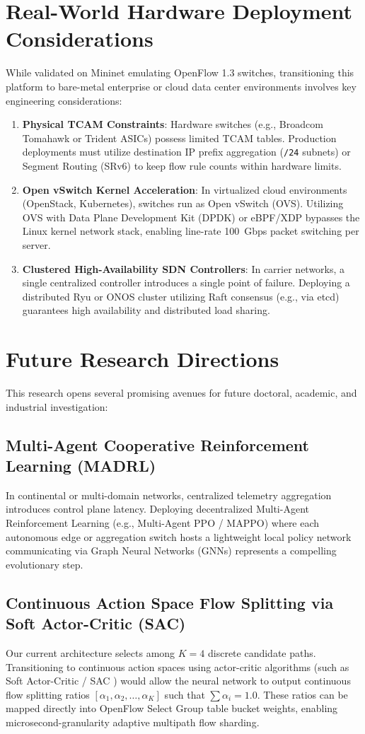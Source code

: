 \documentclass[12pt,a4paper,oneside]{report}
\begin{document}
\section{Real-World Hardware Deployment Considerations}
While validated on Mininet emulating OpenFlow 1.3 switches, transitioning this platform to bare-metal enterprise or cloud data center environments involves key engineering considerations:
\begin{enumerate}
    \item \textbf{Physical TCAM Constraints}: Hardware switches (e.g., Broadcom Tomahawk or Trident ASICs) possess limited TCAM tables. Production deployments must utilize destination IP prefix aggregation (\texttt{/24} subnets) or Segment Routing (SRv6) to keep flow rule counts within hardware limits.
    \item \textbf{Open vSwitch Kernel Acceleration}: In virtualized cloud environments (OpenStack, Kubernetes), switches run as Open vSwitch (OVS). Utilizing OVS with Data Plane Development Kit (DPDK) or eBPF/XDP bypasses the Linux kernel network stack, enabling line-rate 100~Gbps packet switching per server.
    \item \textbf{Clustered High-Availability SDN Controllers}: In carrier networks, a single centralized controller introduces a single point of failure. Deploying a distributed Ryu or ONOS cluster utilizing Raft consensus (e.g., via etcd) guarantees high availability and distributed load sharing.
\end{enumerate}

\section{Future Research Directions}
This research opens several promising avenues for future doctoral, academic, and industrial investigation:

\subsection{Multi-Agent Cooperative Reinforcement Learning (MADRL)}
In continental or multi-domain networks, centralized telemetry aggregation introduces control plane latency. Deploying decentralized Multi-Agent Reinforcement Learning (e.g., Multi-Agent PPO / MAPPO) where each autonomous edge or aggregation switch hosts a lightweight local policy network communicating via Graph Neural Networks (GNNs) represents a compelling evolutionary step.

\subsection{Continuous Action Space Flow Splitting via Soft Actor-Critic (SAC)}
Our current architecture selects among $K=4$ discrete candidate paths. Transitioning to continuous action spaces using actor-critic algorithms (such as Soft Actor-Critic / SAC \cite{lillicrap2015continuous}) would allow the neural network to output continuous flow splitting ratios $[\alpha_1, \alpha_2, \dots, \alpha_K]$ such that $\sum \alpha_i = 1.0$. These ratios can be mapped directly into OpenFlow Select Group table bucket weights, enabling microsecond-granularity adaptive multipath flow sharding.
\end{document}
